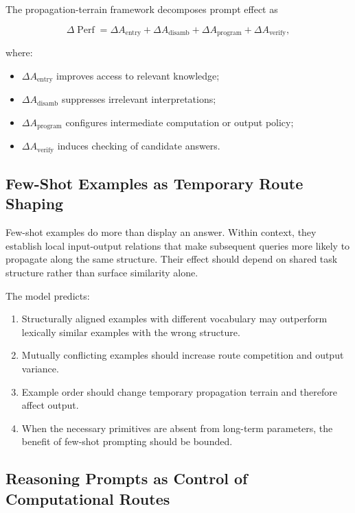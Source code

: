 \documentclass[11pt, a4paper]{article}
\begin{document}
The propagation-terrain framework decomposes prompt effect as


\[
\Delta \operatorname{Perf}
=
\Delta A_{\text{entry}}
+\Delta A_{\text{disamb}}
+\Delta A_{\text{program}}
+\Delta A_{\text{verify}},
\tag{14}
\]

where:


\begin{itemize}
\item $\Delta A_{\text{entry}}$ improves access to relevant knowledge;
\item $\Delta A_{\text{disamb}}$ suppresses irrelevant interpretations;
\item $\Delta A_{\text{program}}$ configures intermediate computation or output policy;
\item $\Delta A_{\text{verify}}$ induces checking of candidate answers.
\end{itemize}


\subsection{Few-Shot Examples as Temporary Route Shaping}


Few-shot examples do more than display an answer. Within context, they establish local input-output relations that make subsequent queries more likely to propagate along the same structure. Their effect should depend on shared task structure rather than surface similarity alone.


The model predicts:


\begin{enumerate}
\item Structurally aligned examples with different vocabulary may outperform lexically similar examples with the wrong structure.
\item Mutually conflicting examples should increase route competition and output variance.
\item Example order should change temporary propagation terrain and therefore affect output.
\item When the necessary primitives are absent from long-term parameters, the benefit of few-shot prompting should be bounded.
\end{enumerate}


\subsection{Reasoning Prompts as Control of Computational Routes}
\end{document}

